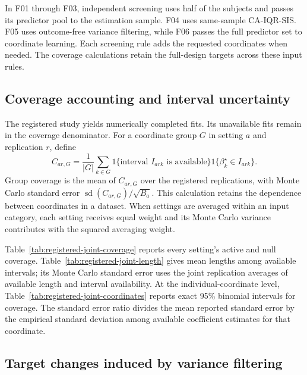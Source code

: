 In F01 through F03, independent screening uses half of the subjects
and passes its predictor pool to the estimation sample. F04 uses
same-sample CA-IQR-SIS. F05 uses outcome-free variance filtering,
while F06 passes the full predictor set to coordinate learning.
Each screening rule adds the requested coordinates when needed.
The coverage calculations retain the full-design targets across
these input rules.

\begingroup\small

\endgroup

\subsection{Coverage accounting and interval uncertainty}

The registered study yields \RegisteredJointAvailable{} numerically
completed fits. Its \RegisteredJointFailures{} unavailable fits
remain in the coverage denominator. For a coordinate group $G$ in
setting $a$ and replication $r$, define
\[
 C_{ar,G}=\frac{1}{|G|}\sum_{k\in G}
  1\{\text{interval }I_{ark}\text{ is available}\}
  1\{\beta_k^\star\in I_{ark}\}.
\]
Group coverage is the mean of $C_{ar,G}$ over the registered
replications, with Monte Carlo standard error
$\operatorname{sd}(C_{ar,G})/\sqrt{B_a}$. This calculation retains
the dependence between coordinates in a dataset. When settings are
averaged within an input category, each setting receives equal weight
and its Monte Carlo variance contributes with the squared averaging
weight.

Table~\ref{tab:registered-joint-coverage} reports every setting's
active and null coverage. Table~\ref{tab:registered-joint-length}
gives mean lengths among available intervals; its Monte Carlo
standard error uses the joint replication averages of available
length and interval availability. At the individual-coordinate level,
Table~\ref{tab:registered-joint-coordinates} reports exact 95\%
binomial intervals for coverage. The standard error ratio divides
the mean reported standard error by the empirical standard deviation
among available coefficient estimates for that coordinate.

\begingroup\small



\endgroup

\subsection{Target changes induced by variance filtering}

